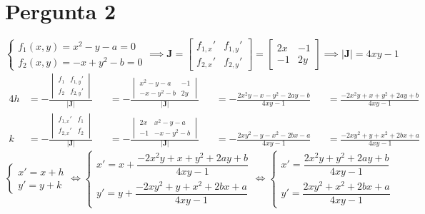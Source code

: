 \section{Pergunta 2}
\begin{equation*}
	\begin{cases}
		f_1(x,y)=x^2-y-a=0\\
		f_2(x,y)=-x+y^2-b=0
	\end{cases}
	\implies
	\mathbf{J}=\begin{bmatrix}
  		f_{1,x}' & f_{1,y}'\\
  		f_{2,x}' & f_{2,y}'
	\end{bmatrix}=\begin{bmatrix}
  		2x & -1\\
  		-1 & 2y
	\end{bmatrix}
	\implies
	|\mathbf{J}|=4xy-1
\end{equation*}
\begin{alignat*}{4}
	h&=-\frac{
		\begin{vmatrix}
			f_1 & f_{1,y}' \\
			f_2 & f_{2,y}'
		\end{vmatrix}}
		{|\mathbf{J}|}
	   &&=-\frac{
		\begin{vmatrix}
			x^2-y-a  & -1 \\
			-x-y^2-b & 2y
		\end{vmatrix}}
		{|\mathbf{J}|}
	   &&=-\frac{2x^2y-x-y^2-2ay-b}{4xy-1}
	   &&=\frac{-2x^2y+x+y^2+2ay+b}{4xy-1} \\
	k&=-\frac{
		\begin{vmatrix}
			f_{1,x}' & f_1 \\
			f_{2,x}' & f_2
		\end{vmatrix}}
		{|\mathbf{J}|}
	   &&=-\frac{
		\begin{vmatrix}
			2x & x^2-y-a \\
			-1 & -x-y^2-b
		\end{vmatrix}}
		{|\mathbf{J}|}
	   &&=-\frac{2xy^2-y-x^2-2bx-a}{4xy-1}
	   &&=\frac{-2xy^2+y+x^2+2bx+a}{4xy-1}
\end{alignat*}
\begin{equation*}
	\begin{cases}
		x'=x+h\\
		y'=y+k
	\end{cases}
	\iff
	\begin{cases}
		x'=x+\dfrac{-2x^2y+x+y^2+2ay+b}{4xy-1}\\[1em]
		y'=y+\dfrac{-2xy^2+y+x^2+2bx+a}{4xy-1}
	\end{cases}
	\iff
	\begin{cases}
		x'=\dfrac{2x^2y+y^2+2ay+b}{4xy-1}\\[1em]
		y'=\dfrac{2xy^2+x^2+2bx+a}{4xy-1}
	\end{cases}
\end{equation*}
